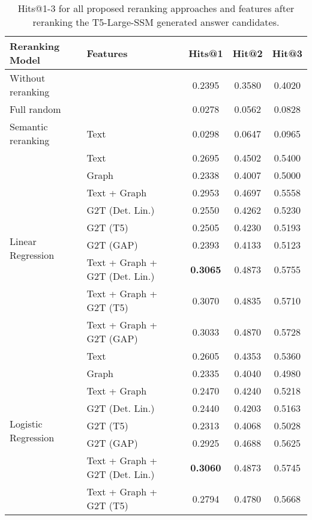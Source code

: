 \begin{table}[htbp]
    \caption{Hits@1-3 for all proposed reranking approaches and features after reranking the T5-Large-SSM generated answer candidates.}
    \label{tab:controllable_fusion:t5_large_ssm_all_results}
    \fontsize{9pt}{11pt}\selectfont
    \centering
    \setlength{\tabcolsep}{3pt}
    \begin{tabular}{l p{5cm} c c c}
        \toprule
        \textbf{Reranking Model} & \textbf{Features} & \textbf{Hits@1} & \textbf{Hit@2} & \textbf{Hit@3} \\
        \midrule
        Without reranking & & 0.2395 & 0.3580 & 0.4020 \\
        \cmidrule(lr){1-5}
        Full random & & 0.0278 & 0.0562 & 0.0828 \\
        \cmidrule(lr){1-5}
        Semantic reranking & Text & 0.0298 & 0.0647 & 0.0965 \\
        \cmidrule(lr){1-5}
        \multirow{9}{*}{Linear Regression} & Text & 0.2695 & 0.4502 & 0.5400 \\
        & Graph & 0.2338 & 0.4007 & 0.5000 \\
        & Text + Graph & 0.2953 & 0.4697 & 0.5558 \\
        & G2T (Det. Lin.) & 0.2550 & 0.4262 & 0.5230 \\
        & G2T (T5) & 0.2505 & 0.4230 & 0.5193 \\
        & G2T (GAP) & 0.2393 & 0.4133 & 0.5123 \\
        & Text + Graph + G2T (Det. Lin.) & \textbf{0.3065} & 0.4873 & 0.5755 \\
        & Text + Graph + G2T (T5) & 0.3070 & 0.4835 & 0.5710 \\
        & Text + Graph + G2T (GAP) & 0.3033 & 0.4870 & 0.5728 \\
        \midrule
        \multirow{12}{*}{Logistic Regression} & Text & 0.2605 & 0.4353 & 0.5360 \\
        & Graph & 0.2335 & 0.4040 & 0.4980 \\
        & Text + Graph & 0.2470 & 0.4240 & 0.5218 \\
        & G2T (Det. Lin.) & 0.2440 & 0.4203 & 0.5163 \\
        & G2T (T5) & 0.2313 & 0.4068 & 0.5028 \\
        & G2T (GAP) & 0.2925 & 0.4688 & 0.5625 \\
        & Text + Graph + G2T (Det. Lin.) & \textbf{0.3060} & 0.4873 & 0.5745 \\
        & Text + Graph + G2T (T5) & 0.2794 & 0.4780 & 0.5668 \\

\end{tabular}
\end{table}
